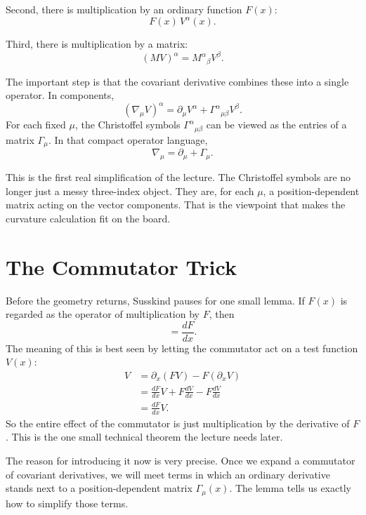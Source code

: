 Second, there is multiplication by an ordinary function \(F(x)\):
\begin{equation}
F(x)\,V^\alpha(x).
\end{equation}

Third, there is multiplication by a matrix:
\begin{equation}
(MV)^\alpha = M^\alpha{}_\beta V^\beta.
\end{equation}

The important step is that the covariant derivative combines these into a single operator. In components,
\begin{equation}
(\nabla_\mu V)^\alpha
=
\partial_\mu V^\alpha
+
\Gamma^\alpha{}_{\mu\beta}V^\beta.
\end{equation}
For each fixed \(\mu\), the Christoffel symbols \(\Gamma^\alpha{}_{\mu\beta}\) can be viewed as the entries of a matrix \(\Gamma_\mu\). In that compact operator language,
\begin{equation}
\nabla_\mu = \partial_\mu + \Gamma_\mu.
\end{equation}

This is the first real simplification of the lecture. The Christoffel symbols are no longer just a messy three-index object. They are, for each \(\mu\), a position-dependent matrix acting on the vector components. That is the viewpoint that makes the curvature calculation fit on the board.

\section{The Commutator Trick}

Before the geometry returns, Susskind pauses for one small lemma. If \(F(x)\) is regarded as the operator of multiplication by \(F\), then
\begin{equation}
[\partial_x,F(x)] = \frac{dF}{dx}.
\end{equation}
The meaning of this is best seen by letting the commutator act on a test function \(V(x)\):
\begin{align}
[\partial_x,F]V
&=
\partial_x(FV)-F(\partial_xV) \\
&=
\frac{dF}{dx}V + F\frac{dV}{dx} - F\frac{dV}{dx} \\
&=
\frac{dF}{dx}V.
\end{align}
So the entire effect of the commutator is just multiplication by the derivative of \(F\). This is the one small technical theorem the lecture needs later.

The reason for introducing it now is very precise. Once we expand a commutator of covariant derivatives, we will meet terms in which an ordinary derivative stands next to a position-dependent matrix \(\Gamma_\mu(x)\). The lemma tells us exactly how to simplify those terms.

